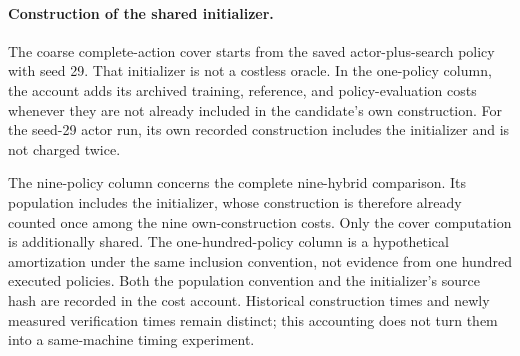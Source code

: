 \paragraph{Construction of the shared initializer.}
The coarse complete-action cover starts from the saved actor-plus-search policy with seed 29. That initializer is not a costless oracle. In the one-policy column, the account adds its archived training, reference, and policy-evaluation costs whenever they are not already included in the candidate's own construction. For the seed-29 actor run, its own recorded construction includes the initializer and is not charged twice.

The nine-policy column concerns the complete nine-hybrid comparison. Its population includes the initializer, whose construction is therefore already counted once among the nine own-construction costs. Only the cover computation is additionally shared. The one-hundred-policy column is a hypothetical amortization under the same inclusion convention, not evidence from one hundred executed policies. Both the population convention and the initializer's source hash are recorded in the cost account. Historical construction times and newly measured verification times remain distinct; this accounting does not turn them into a same-machine timing experiment.
